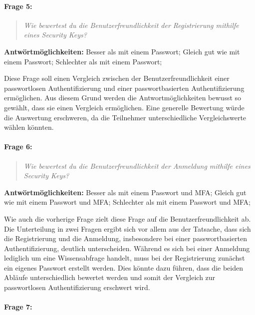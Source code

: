 \paragraph{Frage 5:}

\begin{quote}
    \textit{Wie bewertest du die Benutzerfreundlichkeit der Registrierung mithilfe eines Security Keys?}
\end{quote}

\textbf{Antwörtmöglichkeiten:} Besser als mit einem Passwort; Gleich gut wie mit einem Passwort; Schlechter als mit einem Passwort;

Diese Frage soll einen Vergleich zwischen der Benutzerfreundlichkeit einer passwortlosen Authentifizierung und einer passwortbasierten Authentifizierung ermöglichen. Aus diesem Grund werden die Antwortmöglichkeiten bewusst so gewählt, dass sie einen Vergleich ermöglichen. Eine generelle Bewertung würde die Auswertung erschweren, da die Teilnehmer unterschiedliche Vergleichswerte wählen könnten.

\paragraph{Frage 6:}

\begin{quote}
    \textit{Wie bewertest du die Benutzerfreundlichkeit der Anmeldung mithilfe eines Security Keys?}
\end{quote}

\textbf{Antwörtmöglichkeiten:} Besser als mit einem Passwort und \ac{MFA}; Gleich gut wie mit einem Passwort und \ac{MFA}; Schlechter als mit einem Passwort und \ac{MFA};

Wie auch die vorherige Frage zielt diese Frage auf die Benutzerfreundlichkeit ab. Die Unterteilung in zwei Fragen ergibt sich vor allem aus der Tatsache, dass sich die Registrierung und die Anmeldung, insbesondere bei einer passwortbasierten Authentifizierung, deutlich unterscheiden. Während es sich bei einer Anmeldung lediglich um eine Wissensabfrage handelt, muss bei der Registrierung zunächst ein eigenes Passwort erstellt werden. Dies könnte dazu führen, dass die beiden Abläufe unterschiedlich bewertet werden und somit der Vergleich zur passwortlosen Authentifizierung erschwert wird.

\paragraph{Frage 7:}

